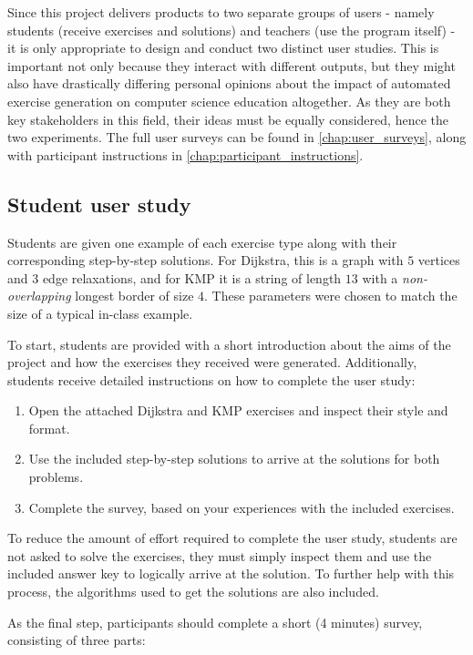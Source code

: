 \documentclass{l4proj}
\begin{document}
Since this project delivers products to two separate groups of users - namely students (receive exercises and solutions) and teachers (use the program itself) - it is only appropriate to design and conduct two distinct user studies. This is important not only because they interact with different outputs, but they might also have drastically differing personal opinions about the impact of automated exercise generation on computer science education altogether. As they are both key stakeholders in this field, their ideas must be equally considered, hence the two experiments. The full user surveys can be found in \autoref{chap:user_surveys}, along with participant instructions in \autoref{chap:participant_instructions}.

\subsection{Student user study}

Students are given one example of each exercise type along with their corresponding step-by-step solutions. For Dijkstra, this is a graph with $5$ vertices and $3$ edge relaxations, and for KMP it is a string of length $13$ with a \emph{non-overlapping} longest border of size $4$. These parameters were chosen to match the size of a typical in-class example. 

To start, students are provided with a short introduction about the aims of the project and how the exercises they received were generated. Additionally, students receive detailed instructions on how to complete the user study:
\begin{enumerate}
	\item
	Open the attached Dijkstra and KMP exercises and inspect their style and format.
	\item
	Use the included step-by-step solutions to arrive at the solutions for both problems.
	\item
	Complete the survey, based on your experiences with the included exercises.
\end{enumerate}

To reduce the amount of effort required to complete the user study, students are not asked to solve the exercises, they must simply inspect them and use the included answer key to logically arrive at the solution. To further help with this process, the algorithms used to get the solutions are also included.

As the final step, participants should complete a short (4 minutes) survey, consisting of three parts:
\end{document}
